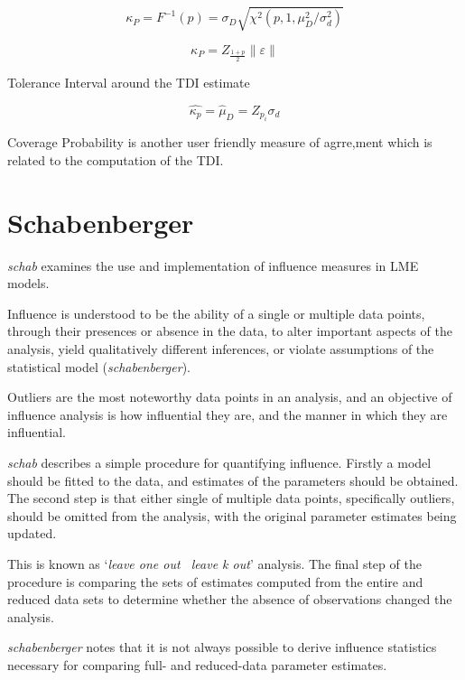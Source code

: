 \documentclass[12pt, a4paper]{report}
\theoremstyle{plain}
\theoremstyle{definition}
\theoremstyle{remark}
\begin{document}
\[ \kappa_P = F^{-1}(p) = \sigma_D \sqrt{\chi^2(p,1,\mu^2_D/\sigma^2_d) }  \]

\[ \kappa_P = Z_{\frac{1+p}{2}} \| \varepsilon\| \]



Tolerance Interval around the TDI estimate

\[ \hat{\kappa_p} = \hat{\mu}_D = Z_{p_i}\sigma_d \]


Coverage Probability is another user friendly measure of agrre,ment which is related to the computation of the TDI.

\section{Schabenberger}

\emph{schab} examines the use and implementation of
influence measures in LME models.

Influence is understood to be the ability of a single or multiple
data points, through their presences or absence in the data, to
alter important aspects of the analysis, yield qualitatively
different inferences, or violate assumptions of the statistical
model (\textit{schabenberger}).

Outliers are the most noteworthy data points in an analysis, and
an objective of influence analysis is how influential they are,
and the manner in which they are influential.

\emph{schab} describes a simple procedure for quantifying
influence. Firstly a model should be fitted to the data, and
estimates of the parameters should be obtained. The second step is
that either single of multiple data points, specifically outliers,
should be omitted from the analysis, with the original parameter
estimates being updated. 

This is known as `\textit{leave one out \ leave k
	out}' analysis. The final step of the procedure is comparing the
sets of estimates computed from the entire and reduced data sets
to determine whether the absence of observations changed the
analysis.

\textit{schabenberger} notes that it is not always possible to
derive influence statistics necessary for comparing full- and
reduced-data parameter estimates. 
\end{document}
